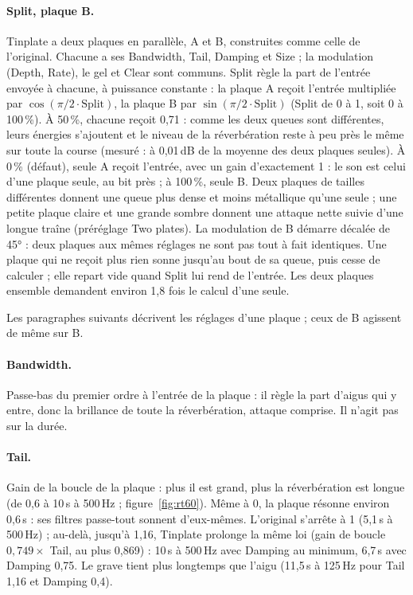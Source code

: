 \documentclass[a4paper,11pt]{article}
\newcommand{\dB}{\,dB}
\begin{document}
\paragraph{Split, plaque B.} Tinplate a deux plaques en parallèle, A et B, construites comme
celle de l'original. Chacune a ses Bandwidth, Tail, Damping et Size ; la modulation (Depth,
Rate), le gel et Clear sont communs. Split règle la part de l'entrée envoyée à chacune, à
puissance constante : la plaque A reçoit l'entrée multipliée par $\cos(\pi/2 \cdot
\mathrm{Split})$, la plaque B par $\sin(\pi/2 \cdot \mathrm{Split})$ (Split de 0 à 1, soit 0 à
100\,\%). À 50\,\%, chacune reçoit 0,71 : comme les deux queues sont différentes, leurs énergies
s'ajoutent et le niveau de la réverbération reste à peu près le même sur toute la course
(mesuré : à 0,01\dB{} de la moyenne des deux plaques seules). À 0\,\% (défaut), seule A reçoit
l'entrée, avec un gain d'exactement 1 : le son est celui d'une plaque seule, au bit près ; à
100\,\%, seule B. Deux plaques de tailles différentes donnent une queue plus dense et moins
métallique qu'une seule ; une petite plaque claire et une grande sombre donnent une attaque
nette suivie d'une longue traîne (préréglage Two plates). La modulation de B démarre décalée de
45° : deux plaques aux mêmes réglages ne sont pas tout à fait identiques. Une plaque qui ne
reçoit plus rien sonne jusqu'au bout de sa queue, puis cesse de calculer ; elle repart vide quand
Split lui rend de l'entrée. Les deux plaques ensemble demandent environ 1,8 fois le calcul d'une
seule.

Les paragraphes suivants décrivent les réglages d'une plaque ; ceux de B agissent de même sur B.

\paragraph{Bandwidth.} Passe-bas du premier ordre à l'entrée de la plaque : il règle la part
d'aigus qui y entre, donc la brillance de toute la réverbération, attaque comprise. Il n'agit
pas sur la durée.

\paragraph{Tail.} Gain de la boucle de la plaque : plus il est grand, plus la réverbération est
longue (de 0,6 à 10\,s à 500\,Hz ; figure~\ref{fig:rt60}). Même à 0, la plaque
résonne environ 0,6\,s : ses filtres passe-tout sonnent d'eux-mêmes. L'original s'arrête à 1
(5,1\,s à 500\,Hz) ; au-delà, jusqu'à 1,16, Tinplate prolonge la même loi (gain de boucle
$0{,}749 \times$ Tail, au plus 0,869) : 10\,s à 500\,Hz avec Damping au minimum, 6,7\,s avec
Damping 0,75. Le grave tient plus longtemps que l'aigu (11,5\,s à 125\,Hz pour Tail 1,16 et
Damping 0,4).
\end{document}
